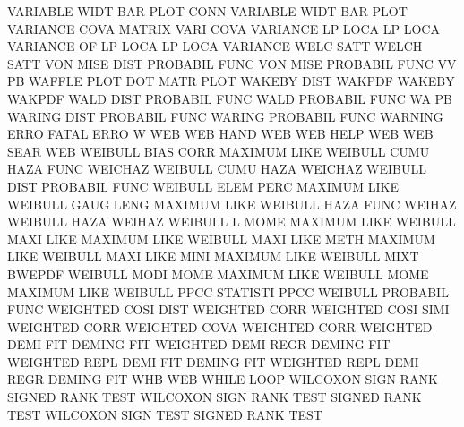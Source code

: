VARIABLE WIDT BAR  PLOT CONN            VARIABLE WIDT BAR  PLOT
VARIANCE COVA                           MATRIX   VARI COVA
VARIANCE LP   LOCA                      LP       LOCA
VARIANCE OF   LP   LOCA                 LP       LOCA
VARIANCE WELC SATT                      WELCH    SATT
VON      MISE DIST                      PROBABIL FUNC
VON      MISE                           PROBABIL FUNC
VV                                      PB
WAFFLE   PLOT                           DOT      MATR PLOT
WAKEBY   DIST                           WAKPDF
WAKEBY                                  WAKPDF
WALD     DIST                           PROBABIL FUNC
WALD                                    PROBABIL FUNC
WA                                      PB
WARING   DIST                           PROBABIL FUNC
WARING                                  PROBABIL FUNC
WARNING  ERRO                           FATAL    ERRO
W                                       WEB
WEB      HAND                           WEB
WEB      HELP                           WEB
WEB      SEAR                           WEB
WEIBULL  BIAS CORR                      MAXIMUM  LIKE
WEIBULL  CUMU HAZA FUNC                 WEICHAZ
WEIBULL  CUMU HAZA                      WEICHAZ
WEIBULL  DIST                           PROBABIL FUNC
WEIBULL  ELEM PERC                      MAXIMUM  LIKE
WEIBULL  GAUG LENG                      MAXIMUM  LIKE
WEIBULL  HAZA FUNC                      WEIHAZ
WEIBULL  HAZA                           WEIHAZ
WEIBULL  L    MOME                      MAXIMUM  LIKE
WEIBULL  MAXI LIKE                      MAXIMUM  LIKE
WEIBULL  MAXI LIKE METH                 MAXIMUM  LIKE
WEIBULL  MAXI LIKE MINI                 MAXIMUM  LIKE
WEIBULL  MIXT                           BWEPDF
WEIBULL  MODI MOME                      MAXIMUM  LIKE
WEIBULL  MOME                           MAXIMUM  LIKE
WEIBULL  PPCC                           STATISTI PPCC
WEIBULL                                 PROBABIL FUNC
WEIGHTED COSI DIST                      WEIGHTED CORR
WEIGHTED COSI SIMI                      WEIGHTED CORR
WEIGHTED COVA                           WEIGHTED CORR
WEIGHTED DEMI FIT                       DEMING   FIT
WEIGHTED DEMI REGR                      DEMING   FIT
WEIGHTED REPL DEMI FIT                  DEMING   FIT
WEIGHTED REPL DEMI REGR                 DEMING   FIT
WHB                                     WEB
WHILE                                   LOOP
WILCOXON SIGN RANK                      SIGNED   RANK TEST
WILCOXON SIGN RANK TEST                 SIGNED   RANK TEST
WILCOXON SIGN TEST                      SIGNED   RANK TEST
